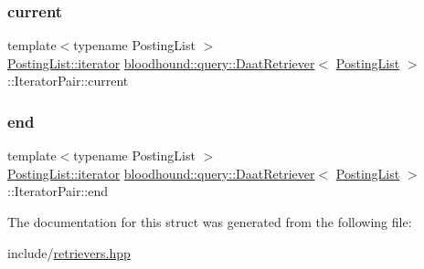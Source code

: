 \subsubsection{\texorpdfstring{current}{current}}
{\footnotesize\ttfamily template$<$typename Posting\+List $>$ \\
\mbox{\hyperlink{structbloodhound_1_1PostingList_1_1iterator}{Posting\+List\+::iterator}} \mbox{\hyperlink{classbloodhound_1_1query_1_1DaatRetriever}{bloodhound\+::query\+::\+Daat\+Retriever}}$<$ \mbox{\hyperlink{classbloodhound_1_1PostingList}{Posting\+List}} $>$\+::Iterator\+Pair\+::current}

\mbox{\label{structbloodhound_1_1query_1_1DaatRetriever_1_1IteratorPair_af2205effb4b97e6351c3d32c034342c2}} 
\subsubsection{\texorpdfstring{end}{end}}
{\footnotesize\ttfamily template$<$typename Posting\+List $>$ \\
\mbox{\hyperlink{structbloodhound_1_1PostingList_1_1iterator}{Posting\+List\+::iterator}} \mbox{\hyperlink{classbloodhound_1_1query_1_1DaatRetriever}{bloodhound\+::query\+::\+Daat\+Retriever}}$<$ \mbox{\hyperlink{classbloodhound_1_1PostingList}{Posting\+List}} $>$\+::Iterator\+Pair\+::end}



The documentation for this struct was generated from the following file\+:\begin{DoxyCompactItemize}
\item 
include/\mbox{\hyperlink{retrievers_8hpp}{retrievers.\+hpp}}\end{DoxyCompactItemize}
